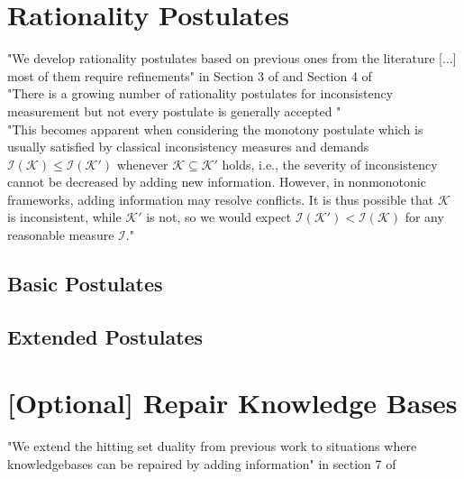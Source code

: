 \section{Rationality Postulates}
"We develop rationality postulates based on previous ones from the literature [...] most of them require refinements" in Section 3 of \cite{ulbricht_measuring_2018} and Section 4 of \cite{ulbricht_handling_2020}
\\
"There is a growing number of rationality postulates for inconsistency measurement but not every postulate is generally accepted \cite{hameurlain_basic_2017} \cite{ferme_revisiting_2014}"
\\
"This becomes apparent when considering the monotony postulate which is usually satisfied by classical inconsistency measures and demands \(\mathcal{I}(\mathcal{K}) \leq \mathcal{I}(\mathcal{K}')\) whenever \(\mathcal{K} \subseteq \mathcal{K}'\) holds, i.e., the severity of inconsistency cannot be decreased by adding new information. However, in nonmonotonic frameworks, adding information may resolve conflicts. It is thus possible that \(\mathcal{K}\) is inconsistent, while \(\mathcal{K}'\) is not, so we would expect \(\mathcal{I}(\mathcal{K}') < \mathcal{I}(\mathcal{K})\) for any reasonable measure \(\mathcal{I}\)."

\subsection{Basic Postulates}

\subsection{Extended Postulates}

\section{[Optional] Repair Knowledge Bases}
"We extend the hitting set duality from previous work \cite{brewka_strong_2019} to situations where knowledgebases can be repaired by adding information" in section 7 of \cite{ulbricht_handling_2020}
